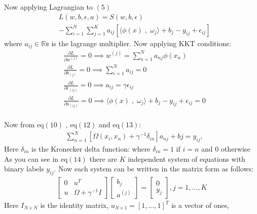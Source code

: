 \documentclass[conference]{IEEEtran}
\begin{document}
    Now applying Lagrangian to $(5)$
    \begin{align*}
        &L(w,b,\epsilon,a) = S(w,b,\epsilon)\\
        &- \sum_{i=1}^{N} \sum_{j=1}^{K} a_{ij}[\langle \phi(x) \;,\; \omega_{j}  \rangle + b_{j} - y_{ij} + \epsilon_{ij}]
    \end{align*}
    where $a_{ij} \in \mathbb{Re}$ is the lagrange multiplier.
    Now applying KKT conditions:
    \begin{align}
        &\frac{{\partial L}}{{\partial w^{(j)}}} = 0 \implies w^{(j)} = \sum_{n=1}^{N}a_{nj}\phi(x_{n}) \\
        &\frac{{\partial L}}{{\partial b_{(j)}}} = 0 \implies \sum_{i=1}^{N}a_{ij} = 0 \\
        &\frac{{\partial L}}{{\partial \epsilon_{(ij)}}} = 0 \implies
        a_{ij} = \gamma \epsilon_{ij} \\
        &\frac{{\partial L}}{{\partial a_{(ij)}}} = 0 \implies
        \langle \phi(x) \;,\; \omega_{j}  \rangle + b_{j} - y_{ij} + \epsilon_{ij} = 0
    \end{align}
    \\
    Now from eq$(10)$ , eq$(12)$ and eq$(13)$:
    \begin{align}
        &\sum_{n=1}^{N} [\Omega(x_{i},x_{n}) + \gamma^{-1}\delta_{in}]a_{nj} + b{j} = y_{ij},
    \end{align}
    Here $\delta_{in}$ is the Kronecker delta function: where $\delta_{in} =1$ if $i=n$ and $0$ otherwise \\
    As you can see in eq$(14)$ there are $K$ independent system of equations with binary labels $y_{ij}$.
    Now each system can be written in the matrix form as follows:
    \begin{align}
        \begin{bmatrix}
            0 & u^{T}                 \\
            u & \Omega + \gamma^{-1}I
        \end{bmatrix}
        \begin{bmatrix}
            b_{j} \\
            a^{(j)}
        \end{bmatrix}
        =
        \begin{bmatrix}
            0 \\
            y_{j}
        \end{bmatrix}
        , j = 1,\ldots,K
    \end{align}
    Here $I_{N \times N}$ is the identity matrix, $u_{N \times 1} = [1,\ldots,1]^{T}$ is a vector of ones,
\end{document}
